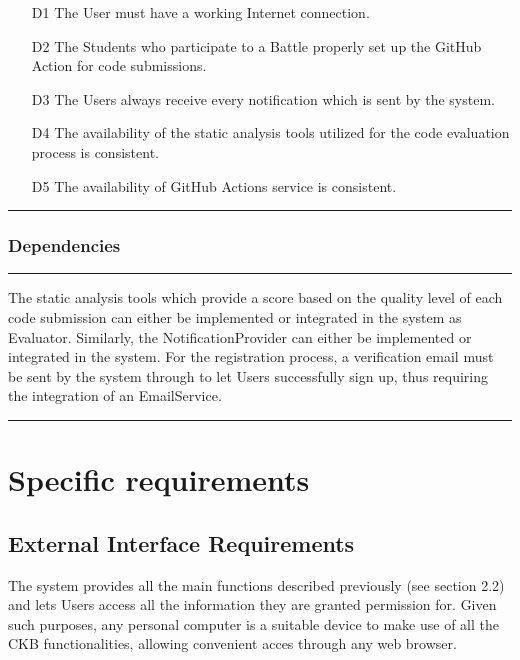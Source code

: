 \documentclass{Configuration_Files/Template}
\begin{document}
\begin{enumerate}
    \item[\textcolor{bluepoli}{D1}] The User must have a working Internet connection.
    \item[\textcolor{bluepoli}{D2}] The Students who participate to a Battle properly set up the GitHub Action for code submissions.
    \item[\textcolor{bluepoli}{D3}] The Users always receive every notification which is sent by the system.
    \item[\textcolor{bluepoli}{D4}] The availability of the static analysis tools utilized for the code evaluation process is consistent.
    \item[\textcolor{bluepoli}{D5}] The availability of GitHub Actions service is consistent.
\end{enumerate}

{\color{bluepoli}\rule{\linewidth}{0.1pt}}

\subsection{Dependencies}

{\color{bluepoli}\rule{\linewidth}{0.1pt}}

The static analysis tools which provide a score based on the quality level of each code submission can either be implemented or integrated in the system as Evaluator. Similarly, the NotificationProvider can either be implemented or integrated in the system. For the registration process, a verification email must be sent by the system through to let Users successfully sign up, thus requiring the integration of an EmailService.

{\color{bluepoli}\rule{\linewidth}{0.1pt}}


\chapter{Specific requirements}

\section{External Interface Requirements}

The system provides all the main functions described previously (see section 2.2) and lets Users access all the information they are granted permission for. Given such purposes, any personal computer is a suitable device to make use of all the CKB functionalities, allowing convenient acces through any web browser.
\end{document}
